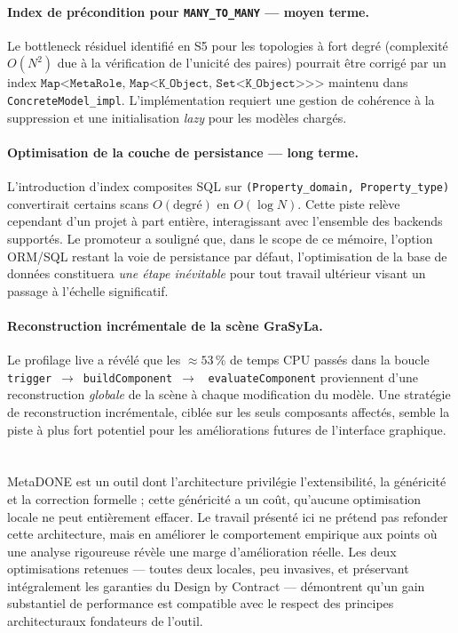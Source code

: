 \paragraph{Index de précondition pour \texttt{MANY\_TO\_MANY} — moyen terme.}
Le bottleneck résiduel identifié en S5 pour les topologies à fort degré
(complexité $O(N^2)$ due à la vérification de l'unicité des paires) pourrait
être corrigé par un index $\texttt{Map<MetaRole, Map<K\_Object,
Set<K\_Object>>>}$ maintenu dans \texttt{ConcreteModel\_impl}. L'implémentation
requiert une gestion de cohérence à la suppression et une initialisation
\emph{lazy} pour les modèles chargés.

\paragraph{Optimisation de la couche de persistance — long terme.}
L'introduction d'index composites SQL sur \texttt{(Property\_domain,
Property\_type)} convertirait certains scans $O(\text{degré})$ en $O(\log N)$.
Cette piste relève cependant d'un projet à part entière, interagissant avec
l'ensemble des backends supportés. Le promoteur a souligné que, dans le scope
de ce mémoire, l'option ORM/SQL restant la voie de persistance par défaut,
l'optimisation de la base de données constituera \emph{une étape inévitable}
pour tout travail ultérieur visant un passage à l'échelle significatif.

\paragraph{Reconstruction incrémentale de la scène GraSyLa.}
Le profilage live a révélé que les $\approx 53\,\%$ de temps CPU passés dans la
boucle \texttt{trigger}~$\rightarrow$~\texttt{buildComponent}~$\rightarrow$~%
\texttt{evaluateComponent} proviennent d'une reconstruction \emph{globale} de
la scène à chaque modification du modèle. Une stratégie de reconstruction
incrémentale, ciblée sur les seuls composants affectés, semble la piste à plus
fort potentiel pour les améliorations futures de l'interface graphique.

\section*{}

MetaDONE est un outil dont l'architecture privilégie l'extensibilité, la
généricité et la correction formelle ; cette généricité a un coût, qu'aucune
optimisation locale ne peut entièrement effacer. Le travail présenté ici ne
prétend pas refonder cette architecture, mais en améliorer le comportement
empirique aux points où une analyse rigoureuse révèle une marge d'amélioration
réelle. Les deux optimisations retenues — toutes deux locales, peu invasives,
et préservant intégralement les garanties du Design by Contract — démontrent
qu'un gain substantiel de performance est compatible avec le respect des
principes architecturaux fondateurs de l'outil.
